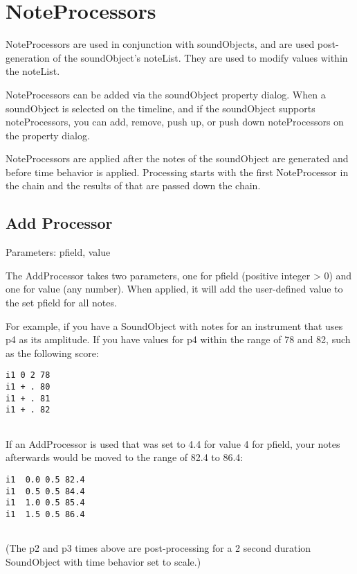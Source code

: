 \section{NoteProcessors}\label{noteProcessors}

NoteProcessors are used in conjunction with soundObjects, and are used
post-generation of the soundObject's noteList. They are used to modify
values within the noteList.

NoteProcessors can be added via the soundObject property dialog. When a
soundObject is selected on the timeline, and if the soundObject supports
noteProcessors, you can add, remove, push up, or push down
noteProcessors on the property dialog.

NoteProcessors are applied after the notes of the soundObject are
generated and before time behavior is applied. Processing starts with
the first NoteProcessor in the chain and the results of that are passed
down the chain.


\subsection{Add Processor}\label{addProcessor}

Parameters: pfield, value

The AddProcessor takes two parameters, one for pfield (positive integer
\textgreater{} 0) and one for value (any number). When applied, it will
add the user-defined value to the set pfield for all notes.

For example, if you have a SoundObject with notes for an instrument that
uses p4 as its amplitude. If you have values for p4 within the range of
78 and 82, such as the following score:

\begin{verbatim}
i1 0 2 78
i1 + . 80
i1 + . 81
i1 + . 82
  
\end{verbatim}

If an AddProcessor is used that was set to 4.4 for value 4 for pfield,
your notes afterwards would be moved to the range of 82.4 to 86.4:

\begin{verbatim}
i1  0.0 0.5 82.4
i1  0.5 0.5 84.4
i1  1.0 0.5 85.4
i1  1.5 0.5 86.4
  
\end{verbatim}

(The p2 and p3 times above are post-processing for a 2 second duration
SoundObject with time behavior set to scale.)


